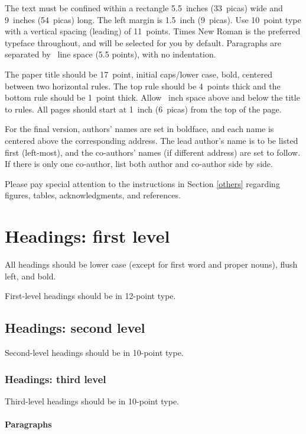 \documentclass{article}
\begin{document}
The text must be confined within a rectangle 5.5~inches (33~picas) wide and
9~inches (54~picas) long. The left margin is 1.5~inch (9~picas).  Use 10~point
type with a vertical spacing (leading) of 11~points.  Times New Roman is the
preferred typeface throughout, and will be selected for you by default.
Paragraphs are separated by ~line space (5.5 points), with no
indentation.

The paper title should be 17~point, initial caps/lower case, bold, centered
between two horizontal rules. The top rule should be 4~points thick and the
bottom rule should be 1~point thick. Allow ~inch space above and
below the title to rules. All pages should start at 1~inch (6~picas) from the
top of the page.

For the final version, authors' names are set in boldface, and each name is
centered above the corresponding address. The lead author's name is to be listed
first (left-most), and the co-authors' names (if different address) are set to
follow. If there is only one co-author, list both author and co-author side by
side.

Please pay special attention to the instructions in Section \ref{others}
regarding figures, tables, acknowledgments, and references.

\section{Headings: first level}
\label{headings}

All headings should be lower case (except for first word and proper nouns),
flush left, and bold.

First-level headings should be in 12-point type.

\subsection{Headings: second level}

Second-level headings should be in 10-point type.

\subsubsection{Headings: third level}

Third-level headings should be in 10-point type.

\paragraph{Paragraphs}
\end{document}
